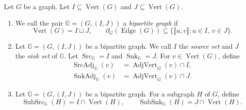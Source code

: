 \begin{definition}\label{def:bipartite-graphs}
Let $G$ be a graph. Let $I\subseteq\operatorname{Vert}(G)$ and $J\subseteq\operatorname{Vert}(G)$.
\begin{enumerate}[font=\itshape]
\item We call the pair $\mathbb G=(G,(I,J))$ a \textit{bipartite graph} if
\[
 \operatorname{Vert}(G)=I\sqcup J,\qquad
 \partial_G(\operatorname{Edge}(G))\subseteq
 \{\llbracket u,v\rrbracket:u\in I,\ v\in J\}.
\]
\item Let $\mathbb G=(G,(I,J))$ be a bipartite graph.
We call $I$ the \textit{source set} and $J$ the \textit{sink set} of $\mathbb G$.
Let $\operatorname{Src}_{\mathbb G}=I$ and $\operatorname{Snk}_{\mathbb G}=J$.
For $v\in\operatorname{Vert}(G)$, define
\[
\begin{aligned}
 \operatorname{SrcAdj}_{\mathbb G}(v)&=\operatorname{AdjVert}_G(v)\cap I,\\
 \operatorname{SnkAdj}_{\mathbb G}(v)&=\operatorname{AdjVert}_G(v)\cap J.
\end{aligned}
\]
\item Let $\mathbb G=(G,(I,J))$ be a bipartite graph. For a subgraph $H$ of $G$, define
\[
 \operatorname{SubSrc}_{\mathbb G}(H)=I\cap\operatorname{Vert}(H),\qquad
 \operatorname{SubSnk}_{\mathbb G}(H)=J\cap\operatorname{Vert}(H).
\]
\end{enumerate}
\end{definition}

